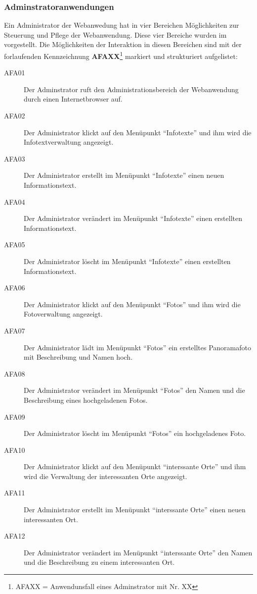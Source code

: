 \subsubsection{Adminstratoranwendungen}
\label{sec:Adminstratoranwendungen}

Ein Administrator der Webanwedung hat in vier Bereichen Möglichkeiten zur
Steuerung und Pflege der Webanwendung. Diese vier Bereiche wurden im
 vorgestellt. Die Möglichkeiten der Interaktion
in diesen Bereichen sind mit der forlaufenden
Kennzeichnung \textbf{AFAXX}\footnote{AFAXX = Anwendunsfall eines Adminstrator
mit Nr. XX} markiert und strukturiert aufgelistet:

\begin{description}
  \item[AFA01] Der Adminstrator ruft den Administrationsbereich der
  Webanwendung durch einen Internetbrowser auf.
  \item[AFA02] Der Administrator klickt auf den Menüpunkt "`Infotexte"' und ihm
  wird die Infotextverwaltung angezeigt.
  \item[AFA03] Der Administrator erstellt im Menüpunkt "`Infotexte"' einen neuen
  Informationstext.
  \item[AFA04] Der Administrator verändert im Menüpunkt "`Infotexte"' einen
  erstellten Informationstext.
  \item[AFA05] Der Administrator löscht im Menüpunkt "`Infotexte"' einen
  erstellten Informationstext.
  \item[AFA06] Der Administrator klickt auf den Menüpunkt "`Fotos"' und ihm wird
  die Fotoverwaltung angezeigt.
  \item[AFA07] Der Administrator lädt im Menüpunkt "`Fotos"' ein erstelltes
  Panoramafoto mit Beschreibung und Namen hoch.
  \item[AFA08] Der Administrator verändert im Menüpunkt "`Fotos"' den Namen und
  die Beschreibung eines hochgeladenen Fotos.
  \item[AFA09] Der Administrator löscht im Menüpunkt "`Fotos"' ein hochgeladenes
  Foto.
  \item[AFA10] Der Administrator klickt auf den Menüpunkt "`interssante Orte"'
  und ihm wird die Verwaltung der interessanten Orte angezeigt.
  \item[AFA11] Der Administrator erstellt im Menüpunkt "`interssante Orte"'
  einen neuen interessanten Ort.
  \item[AFA12] Der Administrator verändert im Menüpunkt "`interssante Orte"' den
  Namen und die Beschreibung zu einem interessanten Ort.

\end{description}

